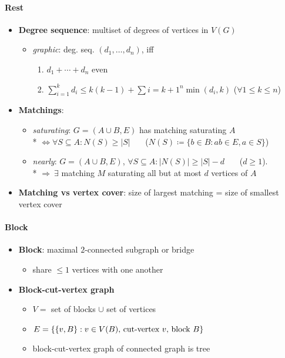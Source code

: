 \paragraph{Rest}
\begin{itemize}
  \item \textbf{Degree sequence}: multiset of degrees of vertices in $ V(G) $
  \begin{itemize}
    \item \emph{graphic}: deg. seq. $ (d_1, \dots, d_n) $, iff
    \begin{enumerate}
       \item $ d_1 + \cdots + d_n $ even
       \item $ \sum_{i=1}^k d_i \leq k(k-1) + \sum{i = k+1}^n \min(d_i,k) $ \quad ($ \forall 1 \leq k \leq n $)
     \end{enumerate} 
  \end{itemize}
  \item \textbf{Matchings}:
  \begin{itemize}
    \item \emph{saturating}: $ G = (A \cup B, E) $ has matching saturating $ A $ \\*
       $\Leftrightarrow \forall S \subseteq A : N(S) \geq \vert S \vert $ \ \ \ ($ N(S) \coloneqq \{ b \in B : ab \in E, a \in S \} $)
    \item \emph{nearly}: $ G = (A \cup B, E) $, $ \forall S \subseteq A : \vert N(S) \vert \geq \vert S \vert - d $ \ \ \  ($ d \geq 1 $). \\*
       $ \Rightarrow \ \exists $ matching $ M $ saturating all but at most $ d $ vertices of $ A $
  \end{itemize}
  \item \textbf{Matching vs vertex cover}: size of largest matching = size of smallest vertex cover
\end{itemize}

\paragraph{Block}
\begin{itemize}
  \item \textbf{Block}: maximal $ 2 $-connected subgraph or bridge
  \begin{itemize}
     \item share $ \leq 1 $ vertices with one another 
   \end{itemize} 
   \item \textbf{Block-cut-vertex graph}
   \begin{itemize}
     \item $ V = $ set of blocks $ \cup $ set of vertices
     \item $ E = \{ \{ v,B \} : v \in V(B) \text{, cut-vertex $ v $, block $ B $} \} $ 
     \item block-cut-vertex graph of connected graph is tree
   \end{itemize}
\end{itemize}

